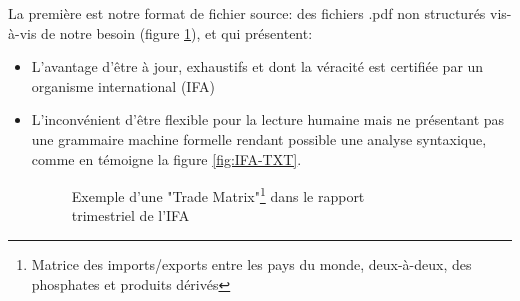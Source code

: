 	La première est notre format de fichier source: des fichiers .pdf  non structurés vis-à-vis de notre besoin (figure \ref{fig:IFA-PDF}), et qui présentent:
		\begin{itemize}
		\item L'avantage d’être à jour, exhaustifs et dont la véracité est certifiée par un organisme international (IFA)
		\item L’inconvénient d’être flexible pour la lecture humaine mais ne présentant pas une grammaire machine formelle rendant possible une analyse syntaxique, comme en témoigne la figure \ref{fig:IFA-TXT}.
			\begin{figure}[H]
			    		\raggedright
		    			\captionsetup{justification=raggedright,
		    			singlelinecheck=false
		    			}
			    		\caption{Exemple d'une "Trade Matrix"\protect\footnote{Matrice des imports/exports entre les pays du monde, deux-à-deux, des phosphates et produits dérivés} dans le rapport\\trimestriel de l'IFA}
			    		\label{fig:IFA-PDF}
			\end{figure}	
		\end{itemize}
		
